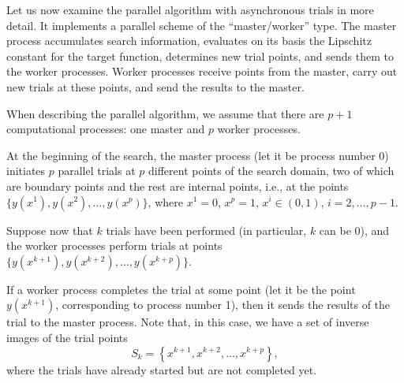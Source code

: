 \documentclass{svproc}
\begin{document}
Let us now examine the parallel algorithm with asynchronous trials in more detail. It implements a parallel scheme of the ``master/worker'' type. The master process accumulates search information, evaluates on its basis the Lipschitz constant for the target function, determines new trial points, and sends them to the worker processes. Worker processes receive points from the master, carry out new trials at these points, and send the results to the master.

When describing the parallel algorithm, we assume that there are $p+1$ computational processes: one master and $p$ worker processes.

At the beginning of the search, the master process (let it be process number 0) initiates $p$ parallel trials at $p$ different points of the search domain, two of which are boundary points and the rest are internal points, i.e., at the points $\{y(x^1), y(x^2), \ldots,y(x^p)\}$, where $x^1 = 0$, $x^p = 1$, $x^i\in(0,1)$, $i=2,\ldots, p-1$.

Suppose now that $k$ trials have been performed (in particular, $k$ can be 0), and the worker processes perform trials at points $\{y(x^{k+1}), y(x^{k+2}), \ldots,y(x^{k+p})\}$.

If a worker process completes the trial at some point (let it be the point $y(x^{k+1})$, corresponding to process number 1), then it sends the results of the trial to the master process. Note that, in this case, we have a set of inverse images of the trial points
\[
S_k = \left\{ x^{k+1},x^{k+2},\ldots,x^{k+p} \right\},
\]
where the trials have already started but are not completed yet.
\end{document}
